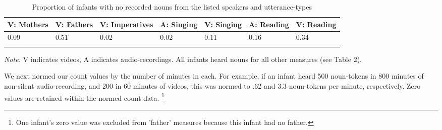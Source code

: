 \documentclass[floatsintext,man]{apa6}
\theoremstyle{definition}
\theoremstyle{definition}
\theoremstyle{definition}
\theoremstyle{remark}
\begin{document}
\begin{table}[tbp]
\begin{center}
\begin{threeparttable}
\caption{\label{tab:propna-missing-tables}Proportion of infants with no recorded nouns from the listed speakers and utterance-types}
\small{
\begin{tabular}{lllllll}
\toprule
V: Mothers & \multicolumn{1}{c}{V: Fathers} & \multicolumn{1}{c}{V: Imperatives} & \multicolumn{1}{c}{A: Singing} & \multicolumn{1}{c}{V: Singing} & \multicolumn{1}{c}{A: Reading} & \multicolumn{1}{c}{V: Reading}\\
\midrule
0.09 & 0.51 & 0.02 & 0.02 & 0.11 & 0.16 & 0.34\\
\bottomrule
\addlinespace
\end{tabular}
}
\begin{tablenotes}[para]
\textit{Note.} V indicates videos, A indicates audio-recordings. All infants heard nouns for all other measures (see Table 2).
\end{tablenotes}
\end{threeparttable}
\end{center}
\end{table}

We next normed our count values by the number of minutes in each. For
example, if an infant heard 500 noun-tokens in 800 minutes of non-silent
audio-recording, and 200 in 60 minutes of videos, this was normed to .62
and 3.3 noun-tokens per minute, respectively. Zero values are retained
within the normed count data.
\footnote{One infant's zero value was excluded from 'father' measures because this infant had no father.}
\end{document}
